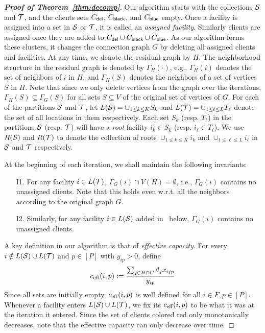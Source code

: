 \begin{proof}[{\bf Proof of Theorem~\ref{thm:decomp}}]

Our algorithm starts with the collections ${\cal S}$ and ${\cal T}$, and the clients sets $C_{\mathsf{del}}$, $C_{\mathsf{black}}$, and $C_{\mathsf{blue}}$ empty. Once a facility is assigned into a set in ${\cal S}$ or ${\cal T}$, it is called an \emph{assigned facility}. Similarly clients are assigned once they are added to $C_{\mathsf{del}} \cup C_{\mathsf{black}} \cup C_{\mathsf{blue}}$.
As our algorithm forms these clusters, it changes the connection graph $G$ by deleting all assigned clients and facilities. At any time, we denote the residual graph by $H$. The neighborhood structure in the residual graph is denoted by $\Gamma_H(\cdot)$, e.g., $\Gamma_H(i)$ denotes the set of neighbors of $i$ in $H$, and $\Gamma_H(S)$ denotes the neighbors of a set of vertices $S$ in $H$. Note that since we only delete vertices from the graph over the iterations, $\Gamma_H(S) \subseteq \Gamma_G(S)$ for all sets $S \subseteq V$ of the original set of vertices of $G$. For each of the partitions ${\cal S}$ and ${\cal T}$, let $L({\cal S}) = \cup_{1\leq k \leq K} S_k$ and $L({\cal T}) = \cup_{1 \leq \ell \leq L} T_\ell$ denote the set of all locations in them respectively.
Each set $S_k$ (resp. $T_\ell$) in the partitions ${\cal S}$ (resp. ${\cal T}$) will have a {\em root} facility $i_k \in S_k$ (resp. $i_\ell \in T_\ell$). We use $R({\cal S})$ and $R({\cal T})$ to denote the collection of roots $\cup_{1 \leq k \leq K} i_k$ and $\cup_{1 \leq \ell \leq L} i_\ell$ in ${\cal S}$ and ${\cal T}$ respectively.

\medskip \noindent
At the beginning of each iteration, we shall maintain the following invariants:
\begin{framed}
\begin{enumerate}%
	\item[I1.] For any facility $i\in L({\cal T})$, $\Gamma_G(i) \cap V(H) = \emptyset$, i.e., $\Gamma_G(i)$  contains no unassigned clients. Note that this holds even w.r.t. all the neighbors according to the original graph $G$.
\item[I2.] Similarly, for any facility $i \in L({\cal S})$ added in~ below, $\Gamma_G(i)$ contains no unassigned clients.
\end{enumerate}
\end{framed}

\noindent
A key definition in our algorithm is that of {\em effective capacity}. For every $i\notin L({\cal S})\cup L({\cal T})$ and $p\in [P]$ with $y_{ip} > 0$, define
\[
c_{\mathrm{eff}}(i,p) := \frac{\sum_{j\in H \cap C} d_j x_{ijp}}{y_{ip}}
\]
Since all sets are initially empty, $c_{\mathrm{eff}}(i,p)$ is well defined for all $i\in F, p\in [P]$. Whenever a facility enters $L({\cal S})\cup L({\cal T})$, we fix its $c_{\mathrm{eff}}(i,p)$ to be what it was at the iteration it entered.
Since the set of clients colored red only monotonically decreases, note that the effective capacity can only decrease over time. %


\end{proof}
